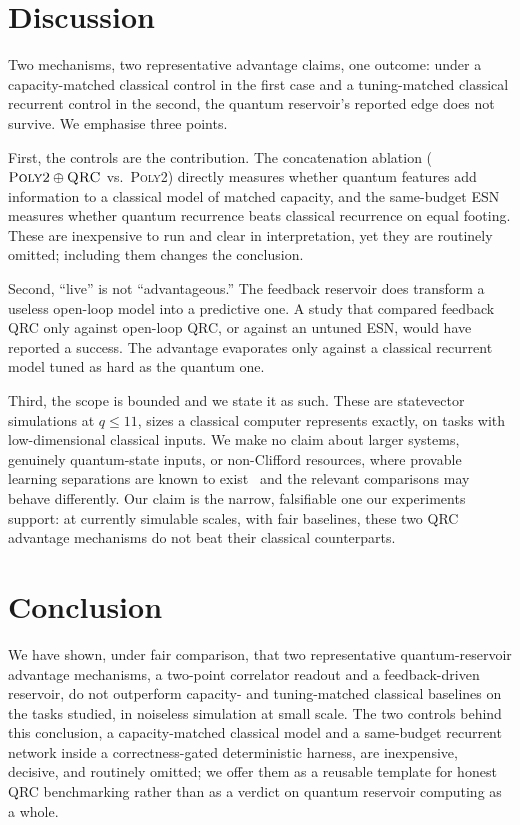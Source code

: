\documentclass[11pt,a4paper]{article}
\begin{document}
\section{Discussion}

Two mechanisms, two representative advantage claims, one outcome: under a
capacity-matched classical control in the first case and a tuning-matched
classical recurrent control in the second, the quantum reservoir's reported edge
does not survive. We emphasise three points.

First, the controls are the contribution. The concatenation ablation
($\textsc{Poly2}\oplus\textsc{QRC}$ vs.\ \textsc{Poly2}) directly measures
whether quantum features add information to a classical model of matched
capacity, and the same-budget ESN measures whether quantum recurrence beats
classical recurrence on equal footing. These are inexpensive to run and clear
in interpretation, yet they are routinely omitted; including them changes the
conclusion.

Second, ``live'' is not ``advantageous.'' The feedback reservoir does
transform a useless open-loop model into a predictive one. A study that
compared feedback QRC only against open-loop QRC, or against an untuned
ESN, would have reported a success. The advantage evaporates only against a
classical recurrent model tuned as hard as the quantum one.

Third, the scope is bounded and we state it as such. These are statevector
simulations at $q \le 11$, sizes a classical computer represents exactly, on
tasks with low-dimensional classical inputs. We make no claim about larger
systems, genuinely quantum-state inputs, or non-Clifford resources, where
provable learning separations are known to exist~\cite{huang2022} and the
relevant comparisons may behave differently. Our claim is the narrow, falsifiable
one our experiments support: at currently simulable scales, with fair baselines,
these two QRC advantage mechanisms do not beat their classical counterparts.

\section{Conclusion}

We have shown, under fair comparison, that two representative
quantum-reservoir advantage mechanisms, a two-point correlator readout and a
feedback-driven reservoir, do not outperform capacity- and tuning-matched
classical baselines on the tasks studied, in noiseless simulation at small
scale. The two controls behind this conclusion, a capacity-matched classical
model and a same-budget recurrent network inside a correctness-gated
deterministic harness, are inexpensive, decisive, and routinely omitted; we
offer them as a reusable template for honest QRC benchmarking rather than as a
verdict on quantum reservoir computing as a whole.
\end{document}
